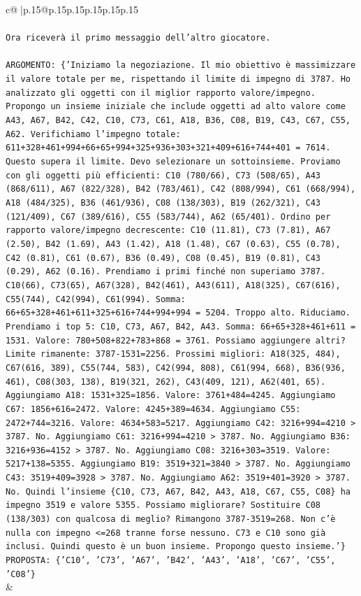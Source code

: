 \documentclass{article}
\begin{document}
{\begin{supertabular}{c@{$\;$}|p{.15\linewidth}@{}p{.15\linewidth}p{.15\linewidth}p{.15\linewidth}p{.15\linewidth}p{.15\linewidth}}
{{{\\ 
\\ 
\texttt{Ora riceverà il primo messaggio dell'altro giocatore.} \\
\\ 
\texttt{ARGOMENTO: \{'Iniziamo la negoziazione. Il mio obiettivo è massimizzare il valore totale per me, rispettando il limite di impegno di 3787. Ho analizzato gli oggetti con il miglior rapporto valore/impegno. Propongo un insieme iniziale che include oggetti ad alto valore come A43, A67, B42, C42, C10, C73, C61, A18, B36, C08, B19, C43, C67, C55, A62. Verifichiamo l'impegno totale: 611+328+461+994+66+65+994+325+936+303+321+409+616+744+401 = 7614. Questo supera il limite. Devo selezionare un sottoinsieme. Proviamo con gli oggetti più efficienti: C10 (780/66), C73 (508/65), A43 (868/611), A67 (822/328), B42 (783/461), C42 (808/994), C61 (668/994), A18 (484/325), B36 (461/936), C08 (138/303), B19 (262/321), C43 (121/409), C67 (389/616), C55 (583/744), A62 (65/401). Ordino per rapporto valore/impegno decrescente: C10 (11.81), C73 (7.81), A67 (2.50), B42 (1.69), A43 (1.42), A18 (1.48), C67 (0.63), C55 (0.78), C42 (0.81), C61 (0.67), B36 (0.49), C08 (0.45), B19 (0.81), C43 (0.29), A62 (0.16). Prendiamo i primi finché non superiamo 3787. C10(66), C73(65), A67(328), B42(461), A43(611), A18(325), C67(616), C55(744), C42(994), C61(994). Somma: 66+65+328+461+611+325+616+744+994+994 = 5204. Troppo alto. Riduciamo. Prendiamo i top 5: C10, C73, A67, B42, A43. Somma: 66+65+328+461+611 = 1531. Valore: 780+508+822+783+868 = 3761. Possiamo aggiungere altri? Limite rimanente: 3787{-}1531=2256. Prossimi migliori: A18(325, 484), C67(616, 389), C55(744, 583), C42(994, 808), C61(994, 668), B36(936, 461), C08(303, 138), B19(321, 262), C43(409, 121), A62(401, 65). Aggiungiamo A18: 1531+325=1856. Valore: 3761+484=4245. Aggiungiamo C67: 1856+616=2472. Valore: 4245+389=4634. Aggiungiamo C55: 2472+744=3216. Valore: 4634+583=5217. Aggiungiamo C42: 3216+994=4210 > 3787. No. Aggiungiamo C61: 3216+994=4210 > 3787. No. Aggiungiamo B36: 3216+936=4152 > 3787. No. Aggiungiamo C08: 3216+303=3519. Valore: 5217+138=5355. Aggiungiamo B19: 3519+321=3840 > 3787. No. Aggiungiamo C43: 3519+409=3928 > 3787. No. Aggiungiamo A62: 3519+401=3920 > 3787. No. Quindi l'insieme \{C10, C73, A67, B42, A43, A18, C67, C55, C08\} ha impegno 3519 e valore 5355. Possiamo migliorare? Sostituire C08 (138/303) con qualcosa di meglio? Rimangono 3787{-}3519=268. Non c'è nulla con impegno <=268 tranne forse nessuno. C73 e C10 sono già inclusi. Quindi questo è un buon insieme. Propongo questo insieme.'\}} \\
\texttt{PROPOSTA: \{'C10', 'C73', 'A67', 'B42', 'A43', 'A18', 'C67', 'C55', 'C08'\}} \\
            }
        }
    }
    & \\ \\


\end{supertabular}}
\end{document}
